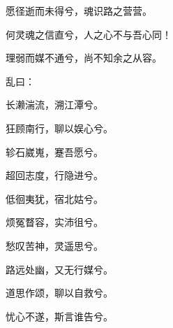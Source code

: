 \documentclass[12pt,a4paper]{ctexbook}
\begin{document}
愿径逝而未得兮，魂识路之营营。\par
何灵魂之信直兮，人之心不与吾心同！\par
理弱而媒不通兮，尚不知余之从容。\par
乱曰：\par
长濑湍流，溯江潭兮。\par
狂顾南行，聊以娱心兮。\par
轸石崴嵬，蹇吾愿兮。\par
超回志度，行隐进兮。\par
低徊夷犹，宿北姑兮。\par
烦冤瞀容，实沛徂兮。\par
愁叹苦神，灵遥思兮。\par
路远处幽，又无行媒兮。\par
道思作颂，聊以自救兮。\par
忧心不遂，斯言谁告兮。\par
\end{document}
